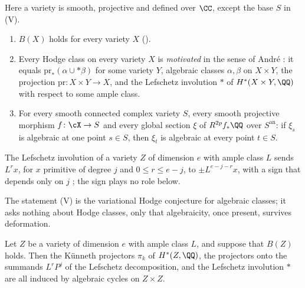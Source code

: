 \begin{definition}\label{def:lmv}
Here a variety is smooth, projective and defined over $\CC$, except the base
$S$ in \textup{(V)}.
\begin{enumerate}[leftmargin=3.0em,itemsep=3pt]
\item[\textup{(L)}] $B(X)$ holds for every variety $X$ (\cite[Definition~10.6]{paperI}).
\item[\textup{(M)}] Every Hodge class on every variety $X$ is
  \emph{motivated} in the sense of Andr\'e \cite[\S2.1]{And96b}: it equals
  $\mathrm{pr}_{*}(\alpha\cup{*}\beta)$ for some variety $Y$, algebraic
  classes $\alpha,\beta$ on $X\times Y$, the projection
  $\mathrm{pr}\colon X\times Y\to X$, and the Lefschetz involution ${*}$ of
  $H^{*}(X\times Y,\QQ)$ with respect to some ample class.
\item[\textup{(V)}] For every smooth connected complex variety $S$, every
  smooth projective morphism $f\colon\cX\to S$ and every global section $\xi$
  of $R^{2p}f_{*}\QQ$ over $S^{\mathrm{an}}$: if $\xi_{s}$ is algebraic at one
  point $s\in S$, then $\xi_{t}$ is algebraic at every point $t\in S$.
\end{enumerate}
The Lefschetz involution of a variety $Z$ of dimension $e$ with ample class
$L$ sends $L^{r}x$, for $x$ primitive of degree $j$ and $0\le r\le e-j$, to
$\pm L^{e-j-r}x$, with a sign that depends only on $j$ \cite{And96b}; the
sign plays no role below.
\end{definition}

The statement (V) is the variational Hodge conjecture for algebraic classes;
it asks nothing about Hodge classes, only that algebraicity, once present,
survives deformation.

\begin{lemma}[Kleiman]\label{lem:lefinvolution}
Let $Z$ be a variety of dimension $e$ with ample class $L$, and suppose that
$B(Z)$ holds. Then the K\"unneth projectors $\pi_{k}$ of $H^{*}(Z,\QQ)$, the
projectors onto the summands $L^{r}P^{j}$ of the Lefschetz decomposition, and
the Lefschetz involution ${*}$ are all induced by algebraic cycles on
$Z\times Z$.
\end{lemma}


